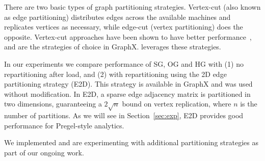 There are two basic types of graph partitioning strategies. Vertex-cut
(also known as edge partitioning) distributes edges across the
available machines and replicates vertices as necessary, while
edge-cut (vertex partitioning) does the opposite.  Vertex-cut
approaches have been shown to have better
performance~\cite{Gonzalez2012}, and are the strategies of choice in
GraphX.  \ql leverages these strategies.

In our experiments we compare performance of SG, OG and HG with (1) no
repartitioning after load, and (2) with repartitioning using the 2D
edge partitioning strategy (E2D).  This strategy is available in
GraphX and was used without modification.  In E2D, a sparse edge
adjacency matrix is partitioned in two dimensions, guaranteeing a $2
\sqrt{n}$ bound on vertex replication, where $n$ is the number of
partitions. As we will see in Section~\ref{sec:exp}, E2D provides good
performance for Pregel-style analytics.

We implemented and are experimenting with additional partitioning
strategies as part of our ongoing work.
